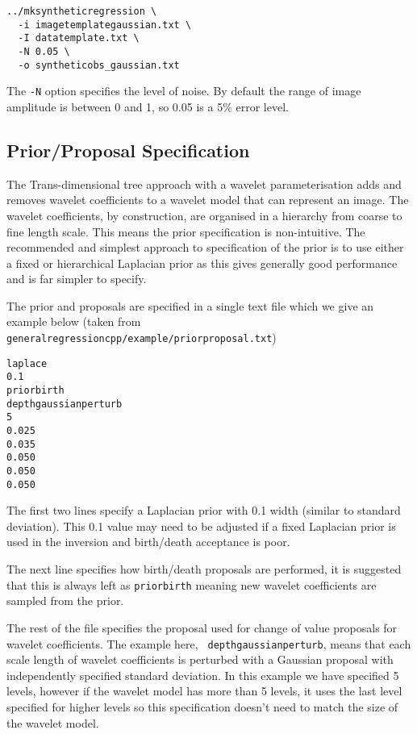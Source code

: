 \documentclass[a4paper,12pt]{article}
\begin{document}
\begin{verbatim}
../mksyntheticregression \
  -i imagetemplategaussian.txt \
  -I datatemplate.txt \
  -N 0.05 \
  -o syntheticobs_gaussian.txt
\end{verbatim}

The {\tt -N} option specifies the level of noise. By default the range of image
amplitude is between 0 and 1, so 0.05 is a 5\% error level.

\subsection{Prior/Proposal Specification}

The Trans-dimensional tree approach with a wavelet parameterisation adds and removes
wavelet coefficients to a wavelet model that can represent an image. The wavelet coefficients,
by construction, are organised in a hierarchy from coarse to fine length scale. This
means the prior specification is non-intuitive. The recommended and simplest
approach to specification of the prior is to use either a fixed or hierarchical
Laplacian prior as this gives generally good performance and is far simpler to
specify.

The prior and proposals are specified in a single text file which we give
an example below (taken from {\tt generalregressioncpp/example/priorproposal.txt})

\begin{verbatim}
laplace
0.1
priorbirth
depthgaussianperturb
5
0.025
0.035
0.050
0.050
0.050
\end{verbatim}

The first two lines specify a Laplacian prior with 0.1 width (similar to standard
deviation). This 0.1 value may need to be adjusted if a fixed Laplacian prior is
used in the inversion and birth/death acceptance is poor.

The next line specifies how birth/death proposals are performed, it is
suggested that this is always left as {\tt priorbirth} meaning new
wavelet coefficients are sampled from the prior.

The rest of the file specifies the proposal used for change of value
proposals for wavelet coefficients. The example here, {\tt
  depthgaussianperturb}, means that each scale length of wavelet
coefficients is perturbed with a Gaussian proposal with independently
specified standard deviation. In this example we have specified 5
levels, however if the wavelet model has more than 5 levels, it uses
the last level specified for higher levels so this specification
doesn't need to match the size of the wavelet model.
\end{document}
